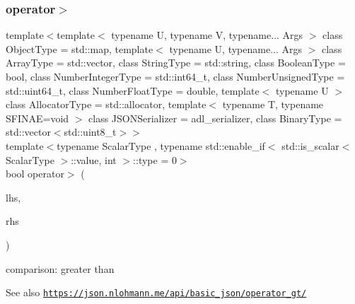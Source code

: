 \subsubsection{\texorpdfstring{operator$>$}{operator>}\hspace{0.1cm}{\footnotesize\ttfamily [3/3]}}
{\footnotesize\ttfamily template$<$template$<$ typename U, typename V, typename... Args $>$ class Object\+Type = std\+::map, template$<$ typename U, typename... Args $>$ class Array\+Type = std\+::vector, class String\+Type  = std\+::string, class Boolean\+Type  = bool, class Number\+Integer\+Type  = std\+::int64\+\_\+t, class Number\+Unsigned\+Type  = std\+::uint64\+\_\+t, class Number\+Float\+Type  = double, template$<$ typename U $>$ class Allocator\+Type = std\+::allocator, template$<$ typename T, typename S\+F\+I\+N\+A\+E=void $>$ class J\+S\+O\+N\+Serializer = adl\+\_\+serializer, class Binary\+Type  = std\+::vector$<$std\+::uint8\+\_\+t$>$$>$ \\
template$<$typename Scalar\+Type , typename std\+::enable\+\_\+if$<$ std\+::is\+\_\+scalar$<$ Scalar\+Type $>$\+::value, int $>$\+::type  = 0$>$ \\
bool operator$>$ (\begin{DoxyParamCaption}\item[{Scalar\+Type}]{lhs,  }\item[{\hyperlink{classnlohmann_1_1basic__json_ab8a1c33ee7b154fc41ca2545aa9724e6}{const\+\_\+reference}}]{rhs }\end{DoxyParamCaption})\hspace{0.3cm}{\ttfamily [friend]}}



comparison\+: greater than 

\begin{DoxySeeAlso}{See also}
\href{https://json.nlohmann.me/api/basic_json/operator_gt/}{\tt https\+://json.\+nlohmann.\+me/api/basic\+\_\+json/operator\+\_\+gt/} 
\end{DoxySeeAlso}
\mbox{\label{classnlohmann_1_1basic__json_a74a943800c7f103d0990d7eef82c6453}} 
